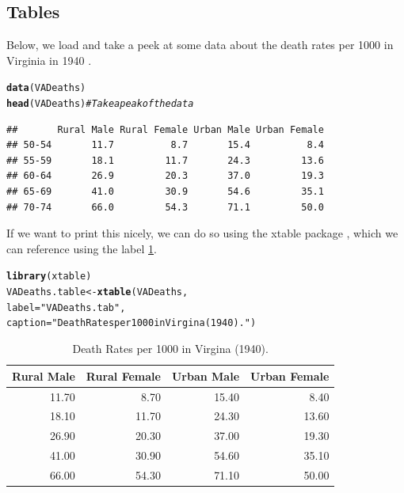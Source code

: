 \documentclass{article}\usepackage[]{graphicx}\usepackage[]{xcolor}
\makeatletter
\newcommand{\hlsng}[1]{\textcolor[rgb]{0.192,0.494,0.8}{#1}}%
\newcommand{\hlcom}[1]{\textcolor[rgb]{0.678,0.584,0.686}{\textit{#1}}}%
\newcommand{\hldef}[1]{\textcolor[rgb]{0.345,0.345,0.345}{#1}}%
\newcommand{\hlkwb}[1]{\textcolor[rgb]{0.69,0.353,0.396}{#1}}%
\newcommand{\hlkwc}[1]{\textcolor[rgb]{0.333,0.667,0.333}{#1}}%
\newcommand{\hlkwd}[1]{\textcolor[rgb]{0.737,0.353,0.396}{\textbf{#1}}}%
\newenvironment{kframe}{%
 \def\at@end@of@kframe{}%
 \ifinner\ifhmode%
  \def\at@end@of@kframe{\end{minipage}}%
  \begin{minipage}{\columnwidth}%
 \fi\fi%
 \def\FrameCommand##1{\hskip\@totalleftmargin \hskip-\fboxsep
 \colorbox{shadecolor}{##1}\hskip-\fboxsep
     \hskip-\linewidth \hskip-\@totalleftmargin \hskip\columnwidth}%
 \MakeFramed {\advance\hsize-\width
   \@totalleftmargin\z@ \linewidth\hsize
   \@setminipage}}%
 {\par\unskip\endMakeFramed%
 \at@end@of@kframe}
\newenvironment{knitrout}{}{} %
\makeatother
\begin{document}
\begin{multicols}{2}
\subsection{Tables}
Below, we load and take a peek at some data about the death rates per 1000 in Virginia in 1940 \citep{Molyneaux1947}.
\begin{knitrout}\scriptsize
{}\color{fgcolor}\begin{kframe}
\begin{alltt}
\hlkwd{data}\hldef{(VADeaths)}
\hlkwd{head}\hldef{(VADeaths)} \hlcom{# Take a peak of the data}
\end{alltt}
\begin{verbatim}
##       Rural Male Rural Female Urban Male Urban Female
## 50-54       11.7          8.7       15.4          8.4
## 55-59       18.1         11.7       24.3         13.6
## 60-64       26.9         20.3       37.0         19.3
## 65-69       41.0         30.9       54.6         35.1
## 70-74       66.0         54.3       71.1         50.0
\end{verbatim}
\end{kframe}
\end{knitrout}

If we want to print this nicely, we can do so using the xtable package \citep{xtable}, which we can reference using the label \ref{VADeaths.tab}.

\begin{knitrout}\scriptsize
{}\color{fgcolor}\begin{kframe}
\begin{alltt}
\hlkwd{library}\hldef{(xtable)}
\hldef{VADeaths.table}\hlkwb{<-}\hlkwd{xtable}\hldef{(VADeaths,}
                       \hlkwc{label} \hldef{=} \hlsng{"VADeaths.tab"}\hldef{,}
                       \hlkwc{caption} \hldef{=} \hlsng{"Death Rates per 1000 in Virgina (1940)."}\hldef{)}
\end{alltt}
\end{kframe}
\end{knitrout}
\begin{table}[H]
\centering
\begingroup\small
\begin{tabular}{rrrr}
  \hline
Rural Male & Rural Female & Urban Male & Urban Female \\ 
  \hline
11.70 & 8.70 & 15.40 & 8.40 \\ 
  18.10 & 11.70 & 24.30 & 13.60 \\ 
  26.90 & 20.30 & 37.00 & 19.30 \\ 
  41.00 & 30.90 & 54.60 & 35.10 \\ 
  66.00 & 54.30 & 71.10 & 50.00 \\ 
   \hline
\end{tabular}
\endgroup
\caption{Death Rates per 1000 in Virgina (1940).} 
\label{VADeaths.tab}
\end{table}





\end{multicols}
\end{document}
